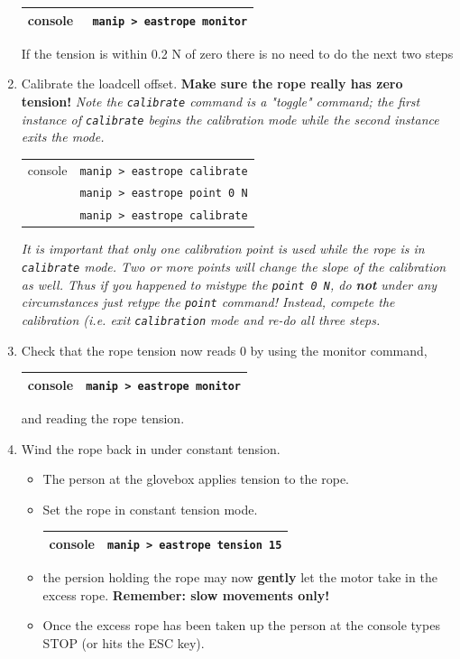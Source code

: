 \documentclass[11pt]{article}
\begin{document}
\begin{enumerate}
\begin{center}
\begin{tabular}{|c|c|}
\hline
console & \verb+ manip > eastrope monitor+ \\
\hline
\end{tabular}
\end{center}
If the tension is within 0.2 N of zero there is no need to do the next two steps
\item \CheckBox[name=cesr5]{} Calibrate the loadcell offset. {\bf Make sure the rope really has zero tension!} {\it Note the \verb+calibrate+ command is a "toggle" command; the first instance of \verb+calibrate+ begins the calibration mode while the second instance exits the mode.}
\begin{center}
	\begin{tabular}{|c|c|}
	\hline
	console & \verb+manip > eastrope calibrate+ \\
	              & \verb+manip > eastrope point 0 N+ \\
	              & \verb+manip > eastrope calibrate+ \\
	           \hline
	\end{tabular}
	\end{center}
{\it It is important that only one calibration point is used while the rope is in \verb+calibrate+ mode. Two or more points will change the slope of the calibration as well. Thus if you happened to mistype the \verb+point 0 N+, do {\bf not} under any circumstances just retype the \verb+point+ command! Instead, compete the calibration (i.e. exit \verb+calibration+ mode and re-do all three steps.}
\item \CheckBox[name=cesr6]{} Check that the rope tension now reads 0 by using the monitor command,
\begin{center}
\begin{tabular}{|c|c|}
\hline
console & \verb+manip > eastrope monitor+ \\
\hline
\end{tabular}
\end{center}
and reading the rope tension.
\item \CheckBox[name=cesr7]{} Wind the rope back in under constant tension.
\begin{itemize}
\item The person at the glovebox applies tension to the rope.
\item Set the rope in constant tension mode.
\begin{center}
\begin{tabular}{|c|c|}
\hline
console & \verb+manip > eastrope tension 15+ \\
\hline
\end{tabular}
\end{center}
\item the persion holding the rope may now {\bf gently} let the motor take in the excess rope. {\bf Remember: slow movements only!}
\item Once the excess rope has been taken up the person at the console types STOP (or hits the ESC key).
\end{itemize}
\end{enumerate}
\end{document}
